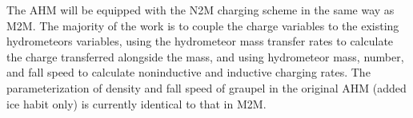  The AHM will be equipped with the N2M charging scheme in the same way as M2M. The majority of the work is to couple the charge variables to the existing hydrometeors variables, using the hydrometeor mass transfer rates to calculate the charge transferred alongside the mass, and using hydrometeor mass, number, and fall speed to calculate noninductive and inductive charging rates. The parameterization of density and fall speed of graupel in the original AHM (added ice habit only) is currently identical to that in M2M. 
